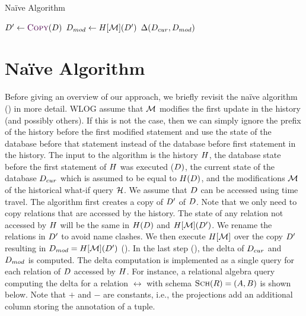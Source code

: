 \newcommand{\naivedbmod}{\db_{mod}}
\newcommand{\naivedbcur}{\db_{cur}}

\begin{algorithm}[t]
  \caption{Naïve \abbrHW Algorithm}
  \label{alg:naive-sol}
  \begin{algorithmic}[1]
    \Procedure{Naive-WhatIf}{$\history$, $\db$, $\naivedbcur$, $\deltaHist$}
    \State $\db' \gets \Call{Copy}{\db}$ \label{alg-line:naive-dbzero}
    \State $\naivedbmod \gets \history[\deltaHist](\db')$ \label{alg-line:naive-mod-history}
    \State \Return $\iDiff{\naivedbcur}{\naivedbmod}$ \label{alg-line:naive-sym-diff}
    \EndProcedure
  \end{algorithmic}
\end{algorithm}

\section{Naïve Algorithm}\label{sec:naive-solution}

Before giving an overview of our approach, we briefly revisit the naïve algorithm () in more detail. WLOG assume that $\deltaHist$ modifies the first update in the history (and possibly others). If this is not the case, then we can simply ignore the prefix of the history before the first modified statement and use the state of the database before that statement instead of the database before first statement in the history. The input to the algorithm is the history $\history$, the database state before the first statement of $\history$ was executed ($D)$, the current state of the database $\naivedbcur$ which is assumed to be equal to $H(D)$, and the modifications $\deltaHist$ of the historical what-if  query $\mathcal{H}$. We assume that $\db$ can be accessed using time travel.
The algorithm first creates a copy of $D'$ of $\db$.  %
Note that we only need to copy relations that are accessed by the history. The state of any relation not accessed by $\history$ will be the same in $H(D)$ and $H[\mathcal{M}](D')$.  We rename the relations in $D'$ to avoid name clashes.
We then execute $H[\mathcal{M}]$ over the copy $D'$  resulting in $\naivedbmod = \ahmod(\db')$ ().
In the last step (), the delta of $\naivedbcur$ and $\naivedbmod$ is computed. The delta computation is implemented as a single query for each relation of $\db$ accessed by $\history$. For instance, a relational algebra query computing the delta for a  relation $\rel$ with schema $\textsc{Sch}(R) = (A,B)$ is shown below. Note that $+$ and $-$ are constants, i.e., the projections add an additional column storing the annotation of a tuple.

